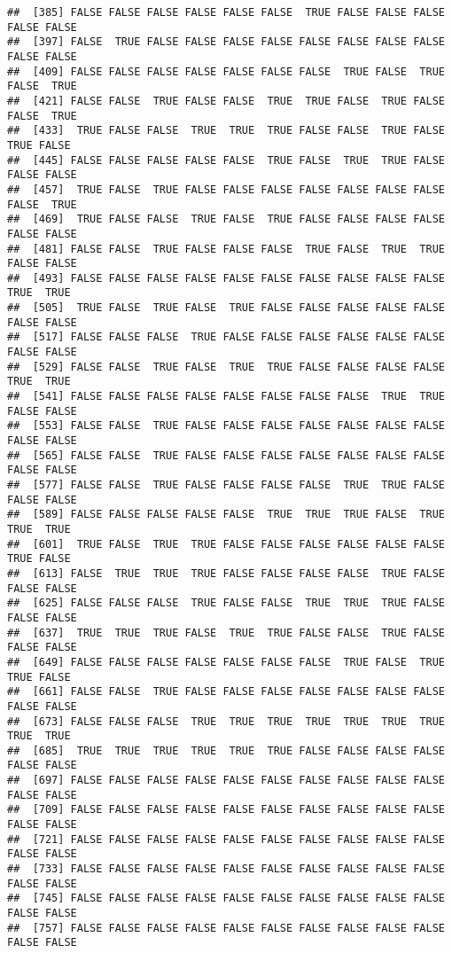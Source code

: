 \documentclass[
]{article}
\begin{document}
\begin{verbatim}
##  [385] FALSE FALSE FALSE FALSE FALSE FALSE  TRUE FALSE FALSE FALSE FALSE FALSE
##  [397] FALSE  TRUE FALSE FALSE FALSE FALSE FALSE FALSE FALSE FALSE FALSE FALSE
##  [409] FALSE FALSE FALSE FALSE FALSE FALSE FALSE  TRUE FALSE  TRUE FALSE  TRUE
##  [421] FALSE FALSE  TRUE FALSE FALSE  TRUE  TRUE FALSE  TRUE FALSE FALSE  TRUE
##  [433]  TRUE FALSE FALSE  TRUE  TRUE  TRUE FALSE FALSE  TRUE FALSE  TRUE FALSE
##  [445] FALSE FALSE FALSE FALSE FALSE  TRUE FALSE  TRUE  TRUE FALSE FALSE FALSE
##  [457]  TRUE FALSE  TRUE FALSE FALSE FALSE FALSE FALSE FALSE FALSE FALSE  TRUE
##  [469]  TRUE FALSE FALSE  TRUE FALSE  TRUE FALSE FALSE FALSE FALSE FALSE FALSE
##  [481] FALSE FALSE  TRUE FALSE FALSE FALSE  TRUE FALSE  TRUE  TRUE FALSE FALSE
##  [493] FALSE FALSE FALSE FALSE FALSE FALSE FALSE FALSE FALSE FALSE  TRUE  TRUE
##  [505]  TRUE FALSE  TRUE FALSE  TRUE FALSE FALSE FALSE FALSE FALSE FALSE FALSE
##  [517] FALSE FALSE FALSE  TRUE FALSE FALSE FALSE FALSE FALSE FALSE FALSE FALSE
##  [529] FALSE FALSE  TRUE FALSE  TRUE  TRUE FALSE FALSE FALSE FALSE  TRUE  TRUE
##  [541] FALSE FALSE FALSE FALSE FALSE FALSE FALSE FALSE  TRUE  TRUE FALSE FALSE
##  [553] FALSE FALSE  TRUE FALSE FALSE FALSE FALSE FALSE FALSE FALSE FALSE FALSE
##  [565] FALSE FALSE  TRUE FALSE FALSE FALSE FALSE FALSE FALSE FALSE FALSE FALSE
##  [577] FALSE FALSE  TRUE FALSE FALSE FALSE FALSE  TRUE  TRUE FALSE FALSE FALSE
##  [589] FALSE FALSE FALSE FALSE FALSE  TRUE  TRUE  TRUE FALSE  TRUE  TRUE  TRUE
##  [601]  TRUE FALSE  TRUE  TRUE FALSE FALSE FALSE FALSE FALSE FALSE  TRUE FALSE
##  [613] FALSE  TRUE  TRUE  TRUE FALSE FALSE FALSE FALSE  TRUE FALSE FALSE FALSE
##  [625] FALSE FALSE FALSE  TRUE FALSE FALSE  TRUE  TRUE  TRUE FALSE FALSE FALSE
##  [637]  TRUE  TRUE  TRUE FALSE  TRUE  TRUE FALSE FALSE  TRUE FALSE FALSE FALSE
##  [649] FALSE FALSE FALSE FALSE FALSE FALSE FALSE  TRUE FALSE  TRUE  TRUE FALSE
##  [661] FALSE FALSE  TRUE FALSE FALSE FALSE FALSE FALSE FALSE FALSE FALSE FALSE
##  [673] FALSE FALSE FALSE  TRUE  TRUE  TRUE  TRUE  TRUE  TRUE  TRUE  TRUE  TRUE
##  [685]  TRUE  TRUE  TRUE  TRUE  TRUE  TRUE FALSE FALSE FALSE FALSE FALSE FALSE
##  [697] FALSE FALSE FALSE FALSE FALSE FALSE FALSE FALSE FALSE FALSE FALSE FALSE
##  [709] FALSE FALSE FALSE FALSE FALSE FALSE FALSE FALSE FALSE FALSE FALSE FALSE
##  [721] FALSE FALSE FALSE FALSE FALSE FALSE FALSE FALSE FALSE FALSE FALSE FALSE
##  [733] FALSE FALSE FALSE FALSE FALSE FALSE FALSE FALSE FALSE FALSE FALSE FALSE
##  [745] FALSE FALSE FALSE FALSE FALSE FALSE FALSE FALSE FALSE FALSE FALSE FALSE
##  [757] FALSE FALSE FALSE FALSE FALSE FALSE FALSE FALSE FALSE FALSE FALSE FALSE

\end{verbatim}
\end{document}
